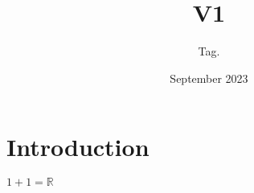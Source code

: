 \documentclass{article}
\title{V1}
\author{Tag. }
\date{September 2023}
\begin{document}
\maketitle

\section{Introduction}
$1+1=\mathbb{R}$
\end{document}
